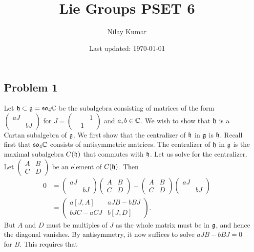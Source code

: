 \documentclass{../../mathnotes}
\title{Lie Groups PSET 6}
\author{Nilay Kumar}
\date{Last updated: \today}
\begin{document}
\maketitle

\subsection*{Problem 1}
    
Let $\mathfrak h\subset\mathfrak g= \mathfrak{so}_4\mathbb{C}$ be the subalgebra consisting of matrices of the form
$\begin{pmatrix}aJ&\\&bJ\end{pmatrix}$ for $J=\begin{pmatrix}&1\\-1&\end{pmatrix}$
and $a,b\in\mathbb{C}$.  We wish to show that $\mathfrak h$ is a Cartan subalgebra of $\mathfrak g$. We first show
that the centralizer of $\mathfrak h$ in $\mathfrak g$ is $\mathfrak h$. Recall first that $\mathfrak{so}_4\mathbb{C}$ consists
of antisymmetric matrices. The centralizer of $\mathfrak h$ in $\mathfrak g$ is the maximal subalgebra $C(\mathfrak h)$
that commutes with $\mathfrak h$. Let us solve for the centralizer. Let $\begin{pmatrix}A&B\\C&D\end{pmatrix}$
be an element of $C(\mathfrak h)$. Then
\begin{align*}
    0&=\begin{pmatrix}
        aJ&\\&bJ
    \end{pmatrix}
    \begin{pmatrix}
        A&B\\C&D
    \end{pmatrix}
    - 
    \begin{pmatrix}
        A&B\\C&D
    \end{pmatrix}
    \begin{pmatrix}
        aJ&\\&bJ
    \end{pmatrix}\\
    &=
    \begin{pmatrix}
        a[J,A]&aJB-bBJ\\
        bJC-aCJ&b[J,D]
    \end{pmatrix}.
\end{align*}
But $A$ and $D$ must be multiples of $J$ as the whole matrix must be in $\mathfrak g$, and hence the diagonal
vanishes. By antisymmetry, it now suffices to solve $aJB-bBJ=0$ for $B$. This requires that
\end{document}
